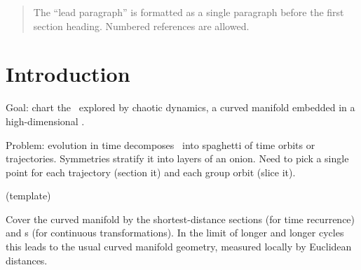
\begin{quotation}
    \ifdraft\color{blue}
The ``lead paragraph'' is formatted as a single paragraph before the first
section heading. Numbered references are allowed.
    \color{black}\fi
\end{quotation}


\section{Introduction}
\label{s:intro}

    \ifdraft\color{blue}
Goal: chart the \statesp\ explored by chaotic dynamics,
a curved manifold embedded in a high-dimensional \statesp.

Problem: evolution in time decomposes \statesp\ into spaghetti of time
orbits or trajectories. Symmetries stratify it into layers of an onion.
Need to pick a single point for each trajectory (section it) and each group orbit
(slice it).

(template)

Cover the curved manifold by the shortest-distance sections (for time
recurrence) and \slice s (for continuous transformations). In the limit of longer
and longer cycles this leads to the usual curved manifold geometry,
measured locally by Euclidean distances.
    \color{black}\fi


